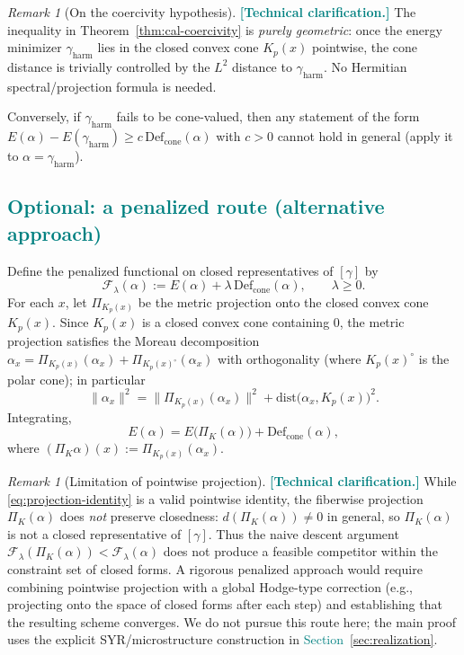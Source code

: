 \documentclass[11pt]{article}
\newcommand{\REVMZ}[1]{\textcolor{teal}{#1}}  %
\numberwithin{equation}{section}  %
\theoremstyle{plain}
\theoremstyle{definition}
\theoremstyle{remark}
\newtheorem{remark}[theorem]{Remark}
\newcommand{\dist}{\mathrm{dist}}
\newcommand{\harm}{\mathrm{harm}}
\newcommand{\gharm}{\gamma_{\harm}}
\newcommand{\Def}{\mathrm{Def}}
\newcommand{\cone}{\mathrm{cone}}
\newcommand{\Defcone}{\Def_{\cone}}          %
\begin{document}
\begin{remark}[On the coercivity hypothesis]\label{rem:coercivity-hypothesis}
\REVMZ{\textbf{[Technical clarification.]}}
The inequality in Theorem~\ref{thm:cal-coercivity} is \emph{purely geometric}: once the energy minimizer $\gharm$ lies in the closed convex cone $K_p(x)$ pointwise,
the cone distance is trivially controlled by the $L^2$ distance to $\gharm$.
No Hermitian spectral/projection formula is needed.

\smallskip\noindent
Conversely, if $\gharm$ fails to be cone-valued, then any statement of the form
$E(\alpha)-E(\gharm)\ge c\,\Defcone(\alpha)$ with $c>0$ cannot hold in general (apply it to $\alpha=\gharm$).
\end{remark}


\REVMZ{\subsection*{Optional: a penalized route (alternative approach)}}

Define the penalized functional on closed representatives of $[\gamma]$ by
\[
\mathcal{F}_\lambda(\alpha) := E(\alpha) + \lambda\,\Defcone(\alpha),
\qquad \lambda \ge 0.
\]
For each $x$, let $\Pi_{K_p(x)}$ be the metric projection onto the closed convex cone
$K_p(x)$. Since $K_p(x)$ is a closed convex cone containing $0$, the metric projection satisfies the Moreau decomposition
$\alpha_x=\Pi_{K_p(x)}(\alpha_x)+\Pi_{K_p(x)^\circ}(\alpha_x)$ with orthogonality (where $K_p(x)^\circ$ is the polar cone); in particular
\[
\|\alpha_x\|^2 = \|\Pi_{K_p(x)}(\alpha_x)\|^2 + \dist\!\bigl(\alpha_x,K_p(x)\bigr)^2.
\]
Integrating,
\begin{equation}\label{eq:projection-identity}
	E(\alpha) = E\!\bigl(\Pi_K(\alpha)\bigr) + \Defcone(\alpha),
\end{equation}
where $(\Pi_K\alpha)(x):=\Pi_{K_p(x)}(\alpha_x)$.

\begin{remark}[Limitation of pointwise projection]
\REVMZ{\textbf{[Technical clarification.]}}
While \eqref{eq:projection-identity} is a valid pointwise identity, the
fiberwise projection $\Pi_K(\alpha)$ does \emph{not} preserve closedness:
$d(\Pi_K(\alpha)) \neq 0$ in general, so $\Pi_K(\alpha)$ is not a closed
representative of $[\gamma]$.  Thus the naive descent argument
$\mathcal{F}_\lambda(\Pi_K(\alpha)) < \mathcal{F}_\lambda(\alpha)$ does not
produce a feasible competitor within the constraint set of closed forms.
A rigorous penalized approach would require combining pointwise projection
with a global Hodge-type correction (e.g., projecting onto the space of
closed forms after each step) and establishing that the resulting scheme
converges.  We do not pursue this route here; the main proof uses the
explicit SYR/microstructure construction in \REVMZ{Section~\ref{sec:realization}}.
\end{remark}
\end{document}
